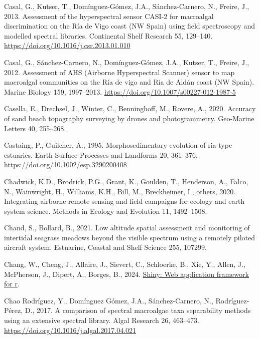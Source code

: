 \documentclass[
  letterpaper,
  11pt,
  english,
  singlespacing,
  headsepline]{MastersDoctoralThesis}
\newlength{\cslhangindent}
\newenvironment{CSLReferences}[2] %
 {\begin{list}{}{%
  \setlength{\itemindent}{0pt}
  \setlength{\leftmargin}{0pt}
  \setlength{\parsep}{0pt}
  \ifodd #1
   \setlength{\leftmargin}{\cslhangindent}
   \setlength{\itemindent}{-1\cslhangindent}
  \fi
  \setlength{\itemsep}{#2\baselineskip}}}
 {\end{list}}
\begin{document}
\begin{CSLReferences}{1}{0}
Casal, G., Kutser, T., Domínguez-Gómez, J.A., Sánchez-Carnero, N.,
Freire, J., 2013. {Assessment of the hyperspectral sensor CASI-2 for
macroalgal discrimination on the R{í}a de Vigo coast (NW Spain) using
field spectroscopy and modelled spectral libraries}. Continental Shelf
Research 55, 129--140. \url{https://doi.org/10.1016/j.csr.2013.01.010}

Casal, G., Sánchez-Carnero, N., Domínguez-Gómez, J.A., Kutser, T.,
Freire, J., 2012. {Assessment of AHS (Airborne Hyperspectral Scanner)
sensor to map macroalgal communities on the R{í}a de vigo and R{í}a de
Ald{á}n coast (NW Spain)}. Marine Biology 159, 1997--2013.
\url{https://doi.org/10.1007/s00227-012-1987-5}

Casella, E., Drechsel, J., Winter, C., Benninghoff, M., Rovere, A.,
2020. Accuracy of sand beach topography surveying by drones and
photogrammetry. Geo-Marine Letters 40, 255--268.

Castaing, P., Guilcher, A., 1995. Morphosedimentary evolution of
ria-type estuaries. Earth Surface Processes and Landforms 20, 361--376.
\url{https://doi.org/10.1002/esp.3290200408}

Chadwick, K.D., Brodrick, P.G., Grant, K., Goulden, T., Henderson, A.,
Falco, N., Wainwright, H., Williams, K.H., Bill, M., Breckheimer, I.,
others, 2020. Integrating airborne remote sensing and field campaigns
for ecology and earth system science. Methods in Ecology and Evolution
11, 1492--1508.

Chand, S., Bollard, B., 2021. Low altitude spatial assessment and
monitoring of intertidal seagrass meadows beyond the visible spectrum
using a remotely piloted aircraft system. Estuarine, Coastal and Shelf
Science 255, 107299.

Chang, W., Cheng, J., Allaire, J., Sievert, C., Schloerke, B., Xie, Y.,
Allen, J., McPherson, J., Dipert, A., Borges, B., 2024.
\href{https://CRAN.R-project.org/package\%20=\%20shiny}{Shiny: Web
application framework for r}.

Chao Rodríguez, Y., Domínguez Gómez, J.A., Sánchez-Carnero, N.,
Rodríguez-Pérez, D., 2017. {A comparison of spectral macroalgae taxa
separability methods using an extensive spectral library}. Algal
Research 26, 463--473. \url{https://doi.org/10.1016/j.algal.2017.04.021}


\end{CSLReferences}
\end{document}
